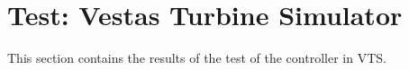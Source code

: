 \section{Test: Vestas Turbine Simulator}
This section contains the results of the test of the controller in VTS.